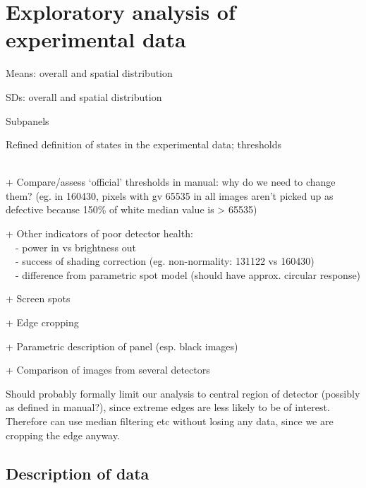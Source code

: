 \documentclass[\main/IO-Pixels.tex]{subfiles}
\begin{document}
\section{Exploratory analysis of experimental data}
\begin{outline}
Means: overall and spatial distribution

SDs: overall and spatial distribution

Subpanels

Refined definition of states in the experimental data; thresholds

\\
+ Compare/assess `official' thresholds in manual: why do we need to change them? (eg. in 160430, pixels with gv 65535 in all images aren't picked up as defective because 150\% of white median value is > 65535) 

+ Other indicators of poor detector health: \\ \-\  \-\ - power in vs brightness out \\ \-\  \-\ - success of shading correction (eg. non-normality: 131122 vs 160430) \\\-\  \-\ - difference from parametric spot model (should have approx. circular response)

+ Screen spots

+ Edge cropping

+ Parametric description of panel (esp. black images)

+ Comparison of images from several detectors
\end{outline}

Should probably formally limit our analysis to central region of detector (possibly as defined in manual?), since extreme edges are less likely to be of interest. Therefore can use median filtering etc without losing any data, since we are cropping the edge anyway.

\subsection{Description of data}
\end{document}
